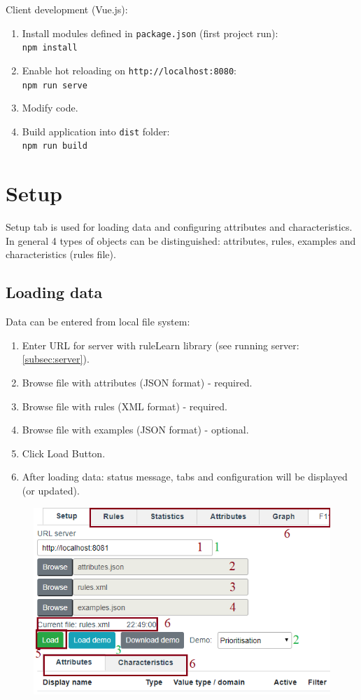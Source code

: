 \documentclass[12pt]{article}
\begin{document}
Client development (Vue.js):
\begin{enumerate}
    \setlength\itemsep{0em}
    \item Install modules defined in \texttt{package.json} (first project run):\\
          \texttt{npm install}
    \item Enable hot reloading on \texttt{http://localhost:8080}: \\
          \texttt{npm run serve}
    \item Modify code.
    \item Build application into \texttt{dist} folder:\\
          \texttt{npm run build}
\end{enumerate}

\pagebreak

\section{Setup}

Setup tab is used for loading data and configuring attributes and characteristics. In general 4 types of objects can be distinguished: attributes, rules, examples and characteristics (rules file). 

\subsection{Loading data}
Data can be entered from local file system:
\begin{enumerate}
    \setlength\itemsep{0em}
    \item Enter URL for server with ruleLearn library (see running server: \ref{subsec:server}).
    \item Browse file with attributes (JSON format) - required.
    \item Browse file with rules (XML format) - required.
    \item Browse file with examples (JSON format) - optional.
    \item Click Load Button.
    \item After loading data: status message, tabs and configuration will be displayed (or updated).
\end{enumerate}

\begin{figure}[H]
    \centering
    \includegraphics{figures/B-setup.png}
\end{figure}
\end{document}
